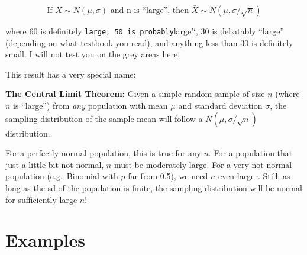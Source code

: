 \documentclass[
  letterpaper,
  DIV=11,
  numbers=noendperiod]{scrreprt}
\begin{document}
\[
\text{If }X\sim N(\mu, \sigma)\text{ and n is ``large'', then }\bar X\sim N(\mu,\sigma/\sqrt{n})
\]

where 60 is definitely
\texttt{large\textquotesingle{}\textquotesingle{},\ 50\ is\ probably}large'`,
30 is debatably ``large'' (depending on what textbook you read), and
anything less than 30 is definitely small. I will not test you on the
grey areas here.

This result has a very special name:

\textbf{The Central Limit Theorem:} Given a simple random sample of size
\(n\) (where \(n\) is ``large'') from \emph{any} population with mean
\(\mu\) and standard deviation \(\sigma\), the sampling distribution of
the sample mean will follow a \(N(\mu, \sigma/\sqrt{n})\) distribution.

For a perfectly normal population, this is true for any \(n\). For a
population that just a little bit not normal, \(n\) must be moderately
large. For a very not normal population (e.g.~Binomial with \(p\) far
from 0.5), we need \(n\) even larger. Still, as long as the sd of the
population is finite, the sampling distribution will be normal for
sufficiently large \(n\)!

\hypertarget{examples-4}{%
\section{Examples}\label{examples-4}}
\end{document}
